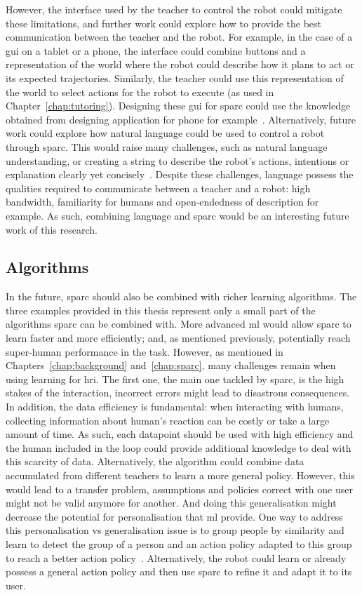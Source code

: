 However, the interface used by the teacher to control the robot could mitigate these limitations, and further work could explore how to provide the best communication between the teacher and the robot. For example, in the case of a \gls{gui} on a tablet or a phone, the interface could combine buttons and a representation of the world where the robot could describe how it plans to act or its expected trajectories. Similarly, the teacher could use this representation of the world to select actions for the robot to execute (as used in Chapter~\ref{chap:tutoring}). Designing these \gls{gui} for \gls{sparc} could use the knowledge obtained from designing application for phone for example~\citep{joorabchi2013real}. Alternatively, future work could explore how natural language could be used to control a robot through \gls{sparc}. This would raise many challenges, such as natural language understanding, or creating a string to describe the robot's actions, intentions or explanation clearly yet concisely~\citep{hayes2017improving}. Despite these challenges, language possess the qualities required to communicate between a teacher and a robot: high bandwidth, familiarity for humans and open-endedness of description for example. As such, combining language and \gls{sparc} would be an interesting future work of this research.

\subsection{Algorithms}

In the future, \gls{sparc} should also be combined with richer learning algorithms. The three examples provided in this thesis represent only a small part of the algorithms \gls{sparc} can be combined with. More advanced \gls{ml} would allow \gls{sparc} to learn faster and more efficiently; and, as mentioned previously, potentially reach super-human performance in the task. However, as mentioned in Chapters~\ref{chap:background} and~\ref{chap:sparc}, many challenges remain when using learning for \gls{hri}. The first one, the main one tackled by \gls{sparc}, is the high stakes of the interaction, incorrect errors might lead to disastrous consequences. In addition, the data efficiency is fundamental: when interacting with humans, collecting information about human's reaction can be costly or take a large amount of time. As such, each datapoint should be used with high efficiency and the human included in the loop could provide additional knowledge to deal with this scarcity of data. Alternatively, the algorithm could combine data accumulated from different teachers to learn a more general policy. However, this would lead to a transfer problem, assumptions and policies correct with one user might not be valid anymore for another. And doing this generalisation might decrease the potential for personalisation that \gls{ml} provide. One way to address this personalisation vs generalisation issue is to group people by similarity and learn to detect the group of a person and an action policy adapted to this group to reach a better action policy~\citep{brunskill2014pac}. Alternatively, the robot could learn or already possess a general action policy and then use \gls{sparc} to refine it and adapt it to its user. 

